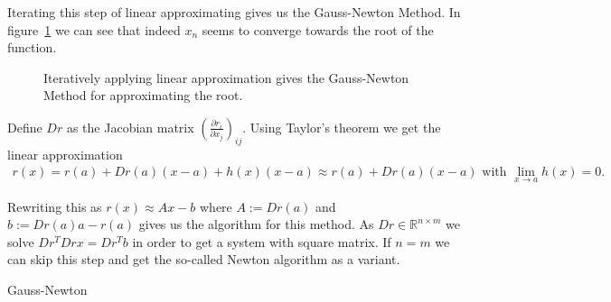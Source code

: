 Iterating this step of linear approximating gives us the Gauss-Newton Method. In\\ figure~\ref{fig:gauss_newton_example} we can see that indeed $x_n$ seems to converge towards the root of the function.

\begin{figure}[h]
	\centering
	\caption{Iteratively applying linear approximation gives the Gauss-Newton Method for approximating the root.}
	\label{fig:gauss_newton_example}
\end{figure}
\newpage

Define $Dr$ as the Jacobian matrix $\left(\frac{\partial r_i}{\partial x_j}\right)_{ij}$. Using Taylor's theorem we get the linear approximation
\begin{align*}
	r(x) = r(a) + Dr(a)(x-a) + h(x)(x-a) \approx r(a) + Dr(a)(x-a) \text{ with } \lim\limits_{x\rightarrow a}h(x) = 0.
\end{align*}

Rewriting this as $r(x) \approx Ax - b$ where $A := Dr(a)$ and $b := Dr(a)a-r(a)$ gives us the algorithm for this method. As $Dr \in \mathds{R}^{n\times m}$ we solve $Dr^T Dr x = Dr^T b$ in order to get a system with square matrix. If $n=m$ we can skip this step and get the so-called Newton algorithm as a variant.

\begin{algorithm}[H] \label{alg:gauss_newton}
	\SetAlgoLined
	\DontPrintSemicolon
	\LinesNumbered
	\caption{Gauss-Newton}
	
	\BlankLine
\end{algorithm}

